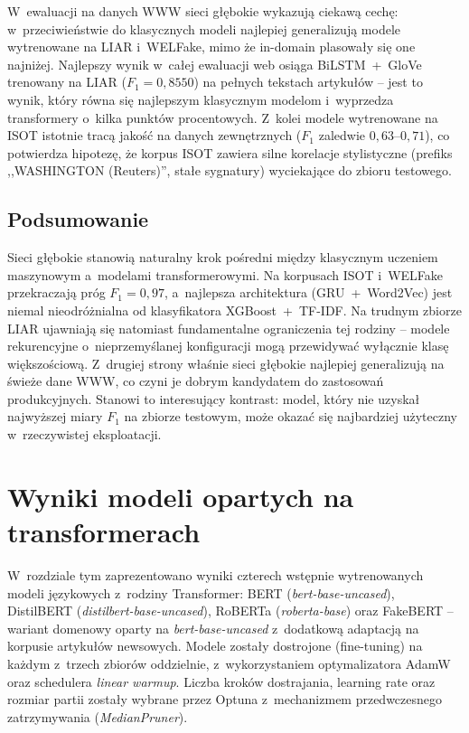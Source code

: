 W~ewaluacji na danych WWW sieci głębokie wykazują ciekawą cechę:
w~przeciwieństwie do klasycznych modeli najlepiej generalizują modele
wytrenowane na LIAR i~WELFake, mimo że in-domain plasowały się one
najniżej. Najlepszy wynik w~całej ewaluacji web osiąga BiLSTM~+~GloVe
trenowany na LIAR (\(F_1 = 0{,}8550\)) na pełnych tekstach
artykułów -- jest to wynik, który równa się najlepszym klasycznym
modelom i~wyprzedza transformery o~kilka punktów procentowych. Z~kolei
modele wytrenowane na ISOT istotnie tracą jakość na danych
zewnętrznych (\(F_1\) zaledwie \(0{,}63\)--\(0{,}71\)), co potwierdza
hipotezę, że korpus ISOT zawiera silne korelacje stylistyczne
(prefiks ,,WASHINGTON (Reuters)'', stałe sygnatury) wyciekające do
zbioru testowego.

\subsection{Podsumowanie}
\label{sec:wyniki_glebokie_podsum}

Sieci głębokie stanowią naturalny krok pośredni między klasycznym
uczeniem maszynowym a~modelami transformerowymi. Na korpusach ISOT
i~WELFake przekraczają próg \(F_1 = 0{,}97\), a~najlepsza architektura
(GRU~+~Word2Vec) jest niemal nieodróżnialna od klasyfikatora
XGBoost~+~TF-IDF. Na trudnym zbiorze LIAR ujawniają się natomiast
fundamentalne ograniczenia tej rodziny -- modele rekurencyjne
o~nieprzemyślanej konfiguracji mogą przewidywać wyłącznie klasę
większościową. Z~drugiej strony właśnie sieci głębokie najlepiej
generalizują na świeże dane WWW, co czyni je dobrym kandydatem do
zastosowań produkcyjnych. Stanowi to interesujący kontrast: model,
który nie uzyskał najwyższej miary $F_1$ na zbiorze testowym, może
okazać się najbardziej użyteczny w~rzeczywistej eksploatacji.

\section{Wyniki modeli opartych na transformerach}
\label{sec:wyniki_transformery}

W~rozdziale tym zaprezentowano wyniki czterech wstępnie wytrenowanych
modeli językowych z~rodziny Transformer: BERT (\textit{bert-base-uncased}),
DistilBERT (\textit{distilbert-base-uncased}), RoBERTa (\textit{roberta-base})
oraz FakeBERT -- wariant domenowy oparty na \textit{bert-base-uncased}
z~dodatkową adaptacją na korpusie artykułów newsowych. Modele zostały
dostrojone (fine-tuning) na każdym z~trzech zbiorów oddzielnie,
z~wykorzystaniem optymalizatora AdamW oraz schedulera \textit{linear
warmup}. Liczba kroków dostrajania, learning rate oraz rozmiar partii
zostały wybrane przez Optuna z~mechanizmem przedwczesnego zatrzymywania
(\textit{MedianPruner}).

